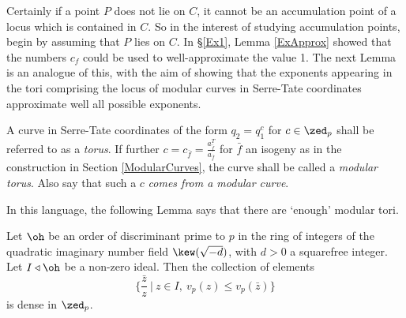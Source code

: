 \documentclass[12pt,letterpaper]{article}
\begin{document}
	Certainly if a point $P$ does not lie on $C$, it cannot be an accumulation point of a locus which is contained in $C$. So in the interest of studying accumulation points, begin by assuming that $P$ lies on $C$. In \S\ref{Ex1}, Lemma \ref{ExApprox} showed that the numbers $c_f$ could be used to well-approximate the value 1. The next Lemma is an analogue of this, with the aim of showing that the exponents appearing in the tori comprising the locus of modular curves in Serre-Tate coordinates approximate well all possible exponents.
	
	\begin{defn}\label{tori}
		A curve in Serre-Tate coordinates of the form $q_2 = q_1^c$ for $c\in \zed_p$ shall be referred to as a \textit{torus}. If further $c=c_{\bar{f}}=\frac{a_{\bar{f}}^T}{a_{\bar{f}}}$ for $\bar{f}$ an isogeny as in the construction in Section \ref{ModularCurves}, the curve shall be called a \textit{modular torus}. Also say that such a $c$ \textit{comes from a modular curve}.
	\end{defn}
	
	In this language, the following Lemma says that there are `enough' modular tori.
	
	\begin{lemma} \label{approxlemma}
		Let $\oh$ be an order of discriminant prime to $p$ in the ring of integers of the quadratic imaginary number field $\kew(\sqrt{-d})$, with $d>0$ a squarefree integer. Let $I\triangleleft \oh$ be a non-zero ideal. Then the collection of elements
		\[\{ \frac{\bar{z}}{z}\ |\ z\in I,\ v_p(z)\leq v_p(\bar{z})\}\] is dense in $\zed_p$. 
	\end{lemma}
	
\end{document}

